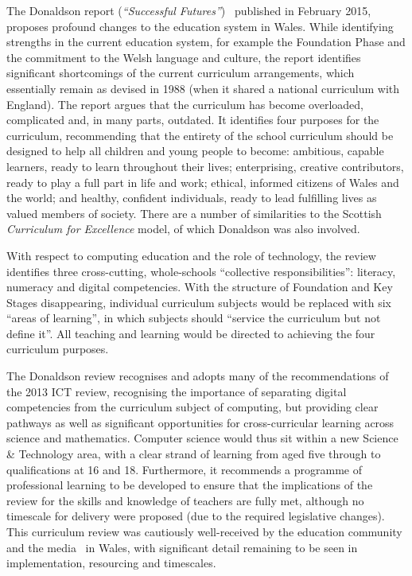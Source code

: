 \documentclass{sig-alternate}
\begin{document}
The Donaldson report (\emph{``Successful
Futures''})~\cite{Donaldson:2015} published in February 2015, proposes
profound changes to the education system in Wales. While identifying
strengths in the current education system, for example the Foundation
Phase and the commitment to the Welsh language and culture, the report
identifies significant shortcomings of the current curriculum
arrangements, which essentially remain as devised in 1988 (when it
shared a national curriculum with England). The report argues that the
curriculum has become overloaded, complicated and, in many parts,
outdated. It identifies four purposes for the curriculum, recommending
that the entirety of the school curriculum should be designed to help
all children and young people to become: ambitious, capable learners,
ready to learn throughout their lives; enterprising, creative
contributors, ready to play a full part in life and work; ethical,
informed citizens of Wales and the world; and healthy, confident
individuals, ready to lead fulfilling lives as valued members of
society. There are a number of similarities to the Scottish
{\emph{Curriculum for Excellence}}
model, %
of which Donaldson was also involved.

With respect to computing education and
the role of technology, the review identifies three cross-cutting,
whole-schools ``collective
responsibilities'': literacy, numeracy and digital competencies. With
the structure of Foundation and Key Stages disappearing, individual
curriculum subjects would be replaced with six ``areas of learning'',
in which subjects should ``service the curriculum but not define
it''. All teaching and learning would be directed to achieving the
four curriculum purposes.

The Donaldson review recognises and adopts many of the
recommendations of the 2013 ICT review, recognising the importance
of separating digital competencies from the curriculum subject of
computing, but providing clear pathways as well as significant
opportunities for cross-curricular learning across science and
mathematics. Computer science would thus sit within a new Science \&
Technology area, with a clear strand of learning from aged five
through to qualifications at 16 and 18. Furthermore, it recommends
a programme of professional learning to be developed to ensure that the
implications of the review for the skills and knowledge of teachers
are fully met, although no timescale for delivery were proposed (due
to the required legislative changes). This curriculum review was
cautiously well-received by the education community and the
media~\cite{bbcnewsdonaldson:2015} in Wales, with significant detail
remaining to be seen in implementation, resourcing and timescales.
\end{document}
